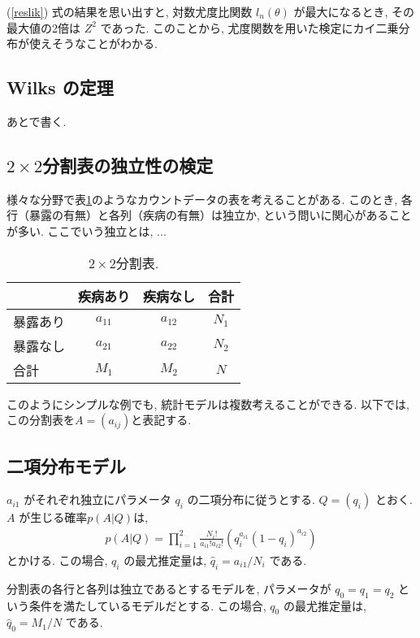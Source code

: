 \documentclass{jarticle}
\begin{document}
(\ref{reslik}) 式の結果を思い出すと, 対数尤度比関数 $l_n(\theta)$ が最大になるとき, その最大値の2倍は $Z^2$ であった. このことから, 尤度関数を用いた検定にカイ二乗分布が使えそうなことがわかる. 

\subsection{Wilks の定理}
\label{secWilks}
あとで書く. 

\subsection{$2 \times 2$分割表の独立性の検定}
様々な分野で表\ref{2by2}のようなカウントデータの表を考えることがある. このとき, 各行（暴露の有無）と各列（疾病の有無）は独立か, という問いに関心があることが多い. 
ここでいう独立とは, ...

\begin{table}[htbp]
\centering
\caption{$2 \times 2$分割表.}
\label{2by2}
\begin{tabular}{l|cc|c}
 & 疾病あり&疾病なし&合計\\
 \hline
 暴露あり&$a_{11}$&$a_{12}$&$N_1$\\
 暴露なし&$a_{21}$&$a_{22}$&$N_2$\\
  \hline
 合計 & $M_1$ & $M_2$ & $N$
\end{tabular}
\end{table}

このようにシンプルな例でも, 統計モデルは複数考えることができる. 以下では, この分割表を$A=(a_{ij})$と表記する. 

\subsection{二項分布モデル}
$a_{i1}$ がそれぞれ独立にパラメータ $q_i$ の二項分布に従うとする.  
$Q=(q_i)$ とおく. 
$A$ が生じる確率$p(A|Q)$は, 
\begin{align}
p(A|Q) = \prod_{i=1}^2 \frac{N_i!}{a_{i1}!a_{i2}!}( q_i^{a_{i1}}(1-q_{i})^{a_{i2}})
\end{align}
とかける.
この場合, $q_i$ の最尤推定量は, $\hat q_{i}=a_{i1}/N_i$ である. 

分割表の各行と各列は独立であるとするモデルを, パラメータが $q_0=q_1=q_2$ という条件を満たしているモデルだとする. 
この場合, $q_0$ の最尤推定量は, $\hat q_{0}=M_1/N$ である.
\end{document}

